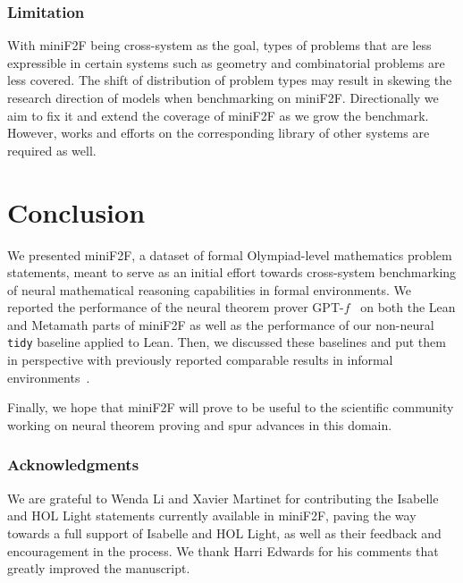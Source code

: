 \subsubsection{Limitation}
With \textsf{miniF2F} being cross-system as the goal, types of problems that are less expressible in certain systems such as geometry and combinatorial problems are less covered. The shift of distribution of problem types may result in skewing the research direction of models when benchmarking on \textsf{miniF2F}. Directionally we aim to fix it and extend the coverage of \textsf{miniF2F} as we grow the benchmark. However, works and efforts on the corresponding library of other systems are required as well.

\section{Conclusion}

We presented \textsf{miniF2F}, a dataset of formal Olympiad-level mathematics problem statements, meant to serve as an initial effort towards cross-system benchmarking of neural mathematical reasoning capabilities in formal environments. We reported the performance of the neural theorem prover GPT-$f$~\citep{polu2020generative} on both the Lean and Metamath parts of \textsf{miniF2F} as well as the performance of our non-neural \texttt{tidy} baseline applied to Lean. Then, we discussed these baselines and put them in perspective with previously reported comparable results in informal environments~\citep{hendrycks2021measuring}.

Finally, we hope that \textsf{miniF2F} will prove to be useful to the scientific community working on neural theorem proving and spur advances in this domain.

\subsubsection*{Acknowledgments}
We are grateful to Wenda Li and Xavier Martinet for contributing the Isabelle and HOL Light statements currently available in \textsf{miniF2F}, paving the way towards a full support of Isabelle and HOL Light, as well as their feedback and encouragement in the process. We thank Harri Edwards for his comments that greatly improved the manuscript.


